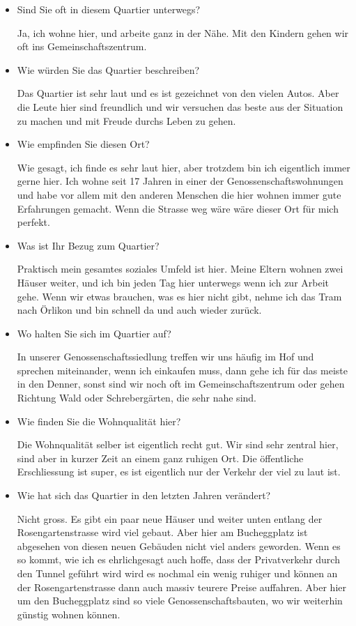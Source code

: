 \documentclass[a4paper,ngerman,11pt]{scrartcl}
\begin{document}
\begin{itemize}
\item Sind Sie oft in diesem Quartier unterwegs?

Ja, ich wohne hier, und arbeite ganz in der Nähe. Mit den Kindern gehen wir
oft ins Gemeinschaftszentrum.

\item Wie würden Sie das Quartier beschreiben?

Das Quartier ist sehr laut und es ist gezeichnet von den vielen Autos. Aber
die Leute hier sind freundlich und wir versuchen das beste aus der Situation
zu machen und mit Freude durchs Leben zu gehen.

\item Wie empfinden Sie diesen Ort?

Wie gesagt, ich finde es sehr laut hier, aber trotzdem bin ich eigentlich
immer gerne hier. Ich wohne seit 17 Jahren in einer der
Genossenschaftswohnungen und habe vor allem mit den anderen Menschen die
hier wohnen immer gute Erfahrungen gemacht. Wenn die Strasse weg wäre wäre
dieser Ort für mich perfekt.

\item Was ist Ihr Bezug zum Quartier?

Praktisch mein gesamtes soziales Umfeld ist hier. Meine Eltern wohnen zwei
Häuser weiter, und ich bin jeden Tag hier unterwegs wenn ich zur Arbeit
gehe. Wenn wir etwas brauchen, was es hier nicht gibt, nehme ich das Tram
nach Örlikon und bin schnell da und auch wieder zurück.

\item Wo halten Sie sich im Quartier auf?

In unserer Genossenschaftssiedlung treffen wir uns häufig im Hof und
sprechen miteinander, wenn ich einkaufen muss, dann gehe ich für das meiste
in den Denner, sonst sind wir noch oft im Gemeinschaftszentrum oder gehen
Richtung Wald oder Schrebergärten, die sehr nahe sind.

\item Wie finden Sie die Wohnqualität hier?

Die Wohnqualität selber ist eigentlich recht gut. Wir sind sehr zentral
hier, sind aber in kurzer Zeit an einem ganz ruhigen Ort. Die öffentliche
Erschliessung ist super, es ist eigentlich nur der Verkehr der viel zu laut
ist.

\item Wie hat sich das Quartier in den letzten Jahren verändert?

Nicht gross. Es gibt ein paar neue Häuser und weiter unten entlang der
Rosengartenstrasse wird viel gebaut. Aber hier am Bucheggplatz ist abgesehen
von diesen neuen Gebäuden nicht viel anders geworden. Wenn es so kommt, wie
ich es ehrlichgesagt auch hoffe, dass der Privatverkehr durch den Tunnel
geführt wird wird es nochmal ein wenig ruhiger und können an der
Rosengartenstrasse dann auch massiv teurere Preise auffahren. Aber hier um
den Bucheggplatz sind so viele Genossenschaftsbauten, wo wir weiterhin
günstig wohnen können.


\end{itemize}
\end{document}

